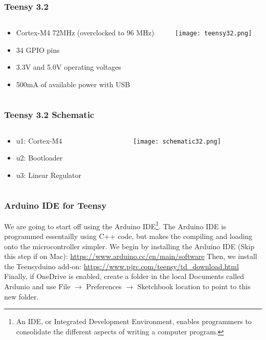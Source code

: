\documentclass{beamer}
\begin{document}
\begin{frame}
\frametitle{Teensy 3.2}
\begin{columns}
\begin{column}{5cm}
\begin{itemize}
\item Cortex-M4 72MHz (overclocked to 96 MHz)
\item 34 GPIO pins
\item 3.3V and 5.0V operating voltages
\item 500mA of available power with USB
\end{itemize}
\vspace{1cm} 
\end{column}
\begin{column}{5cm}
\begin{overprint}
\texttt{[image: teensy32.png]}
\end{overprint}
\end{column}
\end{columns}
\end{frame}

\begin{frame}
\frametitle{Teensy 3.2 Schematic}
\begin{columns}
\begin{column}{4.5cm}
\begin{itemize}
\item u1: Cortex-M4
\item u2: Bootloader
\item u3: Linear Regulator
\end{itemize}
\vspace{1cm} 
\end{column}
\begin{column}{7cm}
\begin{overprint}
\texttt{[image: schematic32.png]}
\end{overprint}
\end{column}
\end{columns}
\end{frame}

\begin{frame}\frametitle{Arduino IDE for Teensy}
We are going to start off using the Arduino IDE\footnote{An IDE, or Integrated Development Environment, enables programmers to consolidate the different aspects of writing a computer program.}. The Arduino IDE is programmed essentailly using C++ code, but makes the compiling and loading onto the microcontroller simpler. 
\newline \newline
We begin by installing the Arduino IDE (Skip this step if on Mac): \url{https://www.arduino.cc/en/main/software}
\newline \newline
Then, we install the Teensyduino add-on: \url{https://www.pjrc.com/teensy/td\_download.html}
\newline \newline
Finally, if OneDrive is enabled, create a folder in the local Documents called Ardunio and use File $\rightarrow$ Preferences $\rightarrow$ Sketchbook location to point to this new folder.
\end{frame}
\end{document}
